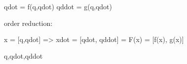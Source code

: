 




    qdot = f(q,qdot)
    qddot = g(q,qdot)

    order reduction:

    x = [q,qdot] => xdot = [qdot, qddot] = F(x) = [f(x), g(x)]


    q,qdot,qddot 




